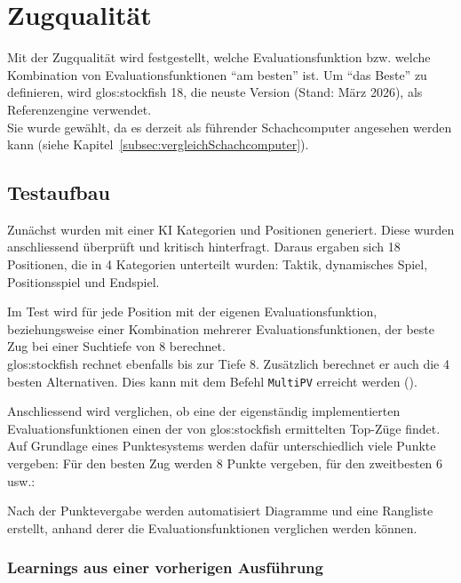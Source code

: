 \section{Zugqualität}
Mit der Zugqualität wird festgestellt, welche Evaluationsfunktion bzw. welche Kombination von Evaluationsfunktionen \enquote{am besten} ist.
Um \enquote{das Beste} zu definieren, wird \gls{glos:stockfish} 18, die neuste Version (Stand: März 2026), als Referenzengine verwendet. \\
Sie wurde gewählt, da es derzeit als führender Schachcomputer angesehen werden kann (siehe Kapitel~\ref{subsec:vergleichSchachcomputer}).

\subsection{Testaufbau}

Zunächst wurden mit einer KI Kategorien und Positionen generiert. Diese wurden anschliessend überprüft und
kritisch hinterfragt. Daraus ergaben sich 18 Positionen, die in 4 Kategorien unterteilt wurden:
Taktik, dynamisches Spiel, Positionsspiel und Endspiel.

Im Test wird für jede Position mit der eigenen Evaluationsfunktion, beziehungsweise einer Kombination mehrerer Evaluationsfunktionen,
der beste Zug bei einer Suchtiefe von 8 berechnet. \\
\gls{glos:stockfish} rechnet ebenfalls bis zur Tiefe 8. Zusätzlich berechnet er auch die 4 besten Alternativen. Dies kann mit dem Befehl \texttt{MultiPV}
erreicht werden (\cite{stockfishMultiPv}).

Anschliessend wird verglichen, ob eine der eigenständig implementierten Evaluationsfunktionen einen der von \gls{glos:stockfish} ermittelten Top-Züge findet.
Auf Grundlage eines Punktesystems werden dafür unterschiedlich viele Punkte vergeben: Für den besten Zug werden 8 Punkte
vergeben, für den zweitbesten 6 usw.:



Nach der Punktevergabe werden automatisiert Diagramme und eine Rangliste erstellt, anhand derer die Evaluationsfunktionen verglichen werden können.

\subsubsection{Learnings aus einer vorherigen Ausführung}

